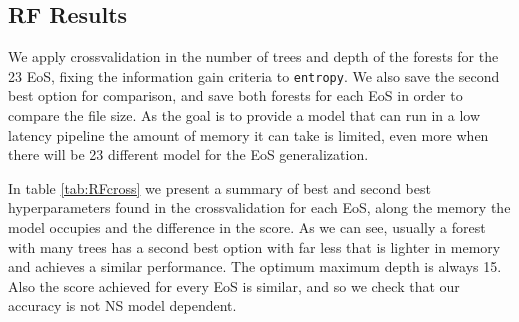 \subsection{RF Results}

We apply crossvalidation in the number of trees and depth of the forests for the 23 EoS, fixing the information gain criteria to \texttt{entropy}. We also save the second best option for comparison, and save both forests for each EoS in order to compare the file size. As the goal is to provide a model that can run in a low latency pipeline the amount of memory it can take is limited, even more when there will be 23 different model for the EoS generalization.

In table \ref{tab:RFcross} we present a summary of best and second best hyperparameters found in the crossvalidation for each EoS, along the memory the model occupies and the difference in the score. As we can see, usually a forest with many trees has a second best option with far less that is lighter in memory and achieves a similar performance. The optimum maximum depth is always 15. Also the score achieved for every EoS is similar, and so we check that our accuracy is not NS model dependent.

